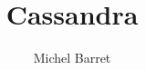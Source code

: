 \documentclass{beamer}
\title{Cassandra}
\author{Michel Barret}
\institute{Viseo}
\begin{document}
\begin{frame}
  \titlepage
\end{frame}

\begin{frame}
  \tableofcontents
\end{frame}







\end{document}
